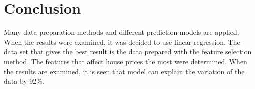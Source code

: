\documentclass[onecolumn]{article}
\begin{document}
\section{Conclusion}

Many data preparation methods and different prediction models are applied. When the results were examined, it was decided to use linear regression. The data set that gives the best result is the data prepared with the feature selection method. The features that affect house prices the most were determined. When the results are examined, it is seen that model can explain the variation of the data by 92\%. 


































\nocite{*}


\end{document}
